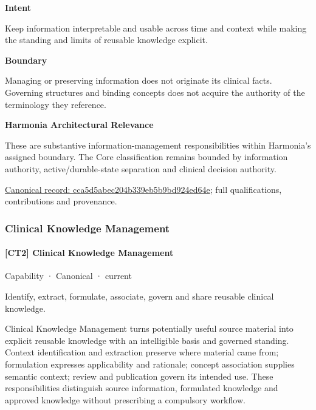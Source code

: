 \textbf{Intent}



Keep information interpretable and usable across time and context while making the standing and limits of reusable knowledge explicit.



\textbf{Boundary}



Managing or preserving information does not originate its clinical facts. Governing structures and binding concepts does not acquire the authority of the terminology they reference.



\textbf{Harmonia Architectural Relevance}



These are substantive information-management responsibilities within Harmonia's assigned boundary. The Core classification remains bounded by information authority, active/durable-state separation and clinical decision authority.


{\footnotesize \href{../../../../continuum/strategy/capability/cca5d5abec204b339eb5b9bd924ed64e.md}{Canonical record: cca5d5abec204b339eb5b9bd924ed64e}; full qualifications, contributions and provenance.}\par
\subsubsection{Clinical Knowledge Management}

\paragraph{[CT2] Clinical Knowledge Management}

\label{element:76b375248aee49aeb5a5044176a688d8}
{\small Capability · Canonical · current}\par

Identify, extract, formulate, associate, govern and share reusable clinical knowledge.



Clinical Knowledge Management turns potentially useful source material into explicit reusable knowledge with an intelligible basis and governed standing. Context identification and extraction preserve where material came from; formulation expresses applicability and rationale; concept association supplies semantic context; review and publication govern its intended use. These responsibilities distinguish source information, formulated knowledge and approved knowledge without prescribing a compulsory workflow.



